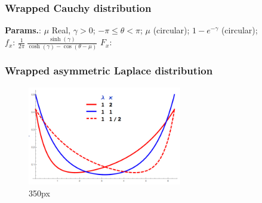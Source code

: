             
    
        
\subsubsection{Wrapped Cauchy distribution}





    {\color{darkblue} \textbf{Params.}:} {$\mu$ Real,  $\gamma>0$}; {$-\pi\le\theta<\pi$}; {$\mu$ (circular)}; {$1-e^{-\gamma}$ (circular)};\hspace{0.5cm}\\{\color{darkblue} \textbf{$f_x$}:} {$\frac{1}{2\pi}\,\frac{\sinh(\gamma)}{\cosh(\gamma)-\cos(\theta-\mu)}$}{\color{darkblue} \textbf{$F_x$}:} {$\,$}



    
        
\subsubsection{Wrapped asymmetric Laplace distribution}


    \begin{figure}[H]
        \centering
        \includegraphics[width=0.6\textwidth]{images/WrappedAsymmetricLaplacePDF.jpg}
        \caption{350px}
    \end{figure}




